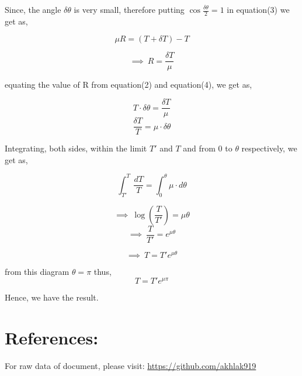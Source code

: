 \documentclass[12pt,a4paper]{article}
\begin{document}
    Since, the angle $\delta \theta$ is very small, therefore putting $\cos\frac{\delta \theta}{2} = 1$ in equation(3) we get as,

    \[\mu R = \left(T + \delta T\right) - T\]

    \begin{equation*}
        \implies\ R = \frac{\delta T}{\mu} \tag*{(4)}
    \end{equation*}

    equating the value of R from equation(2) and equation(4), we get as,

    \[T\cdot \delta \theta = \frac{\delta T}{\mu} \]
    \[\frac{\delta T}{T} = \mu \cdot \delta \theta\]

    Integrating, both sides, within the limit $T'$ and $T$ and from $0$ to $\theta$ respectively, we get as,

    \[\int_{T'}^{T}\frac{dT}{T} = \int_{0}^{\theta}\mu \cdot d\theta\]
    
    \[\implies\ \log\left(\frac{T}{T'}\right) = \mu \theta\]
    \[\implies\ \frac{T}{T'} = e^{\mu \theta}\]

    \[\implies\ \boxed{T = T'e^{\mu \theta}}\]

    \begin{center}
        \def\svgwidth{5cm}
        
    \end{center}

    \begin{center}
        from this diagram $\theta = \pi$
    thus, 
    \[\boxed{T = T'e^{\mu \pi}}\]

    Hence, we have the result.
    \end{center}

    \section*{References:}

    For raw data of document, please visit: \url{https://github.com/akhlak919}


    

   
  

   

    
\end{document}

